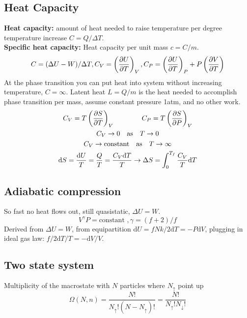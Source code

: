 \documentclass[a4paper, norsk, 8pt]{article}
\begin{document}
\begin{multicols*}{3}
\subsection*{\footnotesize  Heat Capacity}
\textbf{Heat capacity:} amount of heat needed to raise temperature per degree temperature increase $C=Q/\Delta T$.\\
\textbf{Specific heat capacity:} Heat capacity per unit mass $c=C/m$.\\
\begin{equation*}
  C = (\Delta U - W)/\Delta T, C_V = \left(\pdv{U}{T}\right)_V, C_P = \left(\pdv{U}{T}\right)_P + P\left( \pdv{V}{T} \right)
\end{equation*}
At the phase transition you can put heat into system without increasing temperature, $C=\infty$. Latent heat $L=Q/m$ is the heat needed to accomplish phase transition per mass, assume constant pressure 1atm, and no other work.
\begin{gather*}
  C_V = T\left( \pdv{S}{T} \right)_V \qquad \qquad   C_P = T \left( \pdv{S}{P} \right)_V\\
  C_V \rightarrow 0 \quad \text{as} \quad T \rightarrow 0 \\
  C_V \rightarrow \text{constant} \quad \text{as} \quad T \rightarrow \infty \\
  \mbox{d}S = \frac{\mbox{d}U}{T} = \frac{Q}{T} = \frac{C_V\mbox{d}T}{T} \rightarrow \Delta S = \int_0^{T_f}\frac{C_V}{T}\mbox{d}T
\end{gather*}


\subsection*{\footnotesize  Adiabatic compression}
So fast no heat flows out, still quasistatic, $\Delta U = W$.
$$V^{\gamma}P = \text{constant }, \gamma = (f+2)/f$$
Derived from $\Delta U = W$, from equipartition $\mbox{d}U=fNk/2 \mbox{d}T = -P\mbox{d}V$, plugging in ideal gas law: $f/2 \mbox{d}T/T = -\mbox{d}V/V$.
\subsection*{\footnotesize  Two state system}
Multiplicity of the macrostate with $N$ particles where $N_{\uparrow}$ point up
\begin{equation*}
  \Omega(N, n) = \frac{N!}{N_{\uparrow}! (N-N_{\uparrow})!} =  \frac{N!}{N_{\uparrow}! N_{\downarrow}!}
\end{equation*}

\end{multicols*}
\end{document}

